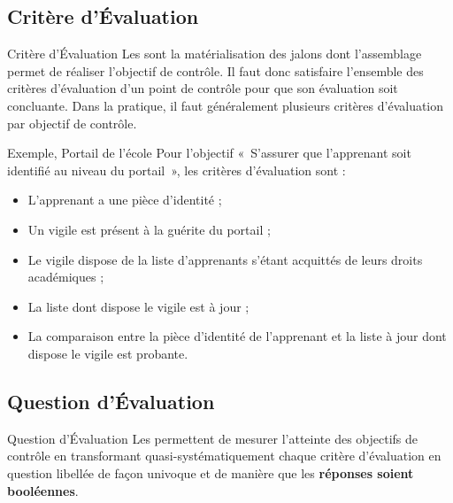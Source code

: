 \subsection{Critère d'Évaluation}

\begin{boxdef}{Critère d'Évaluation}
Les  sont la matérialisation des jalons dont
l'assemblage permet de réaliser l'objectif de contrôle. Il faut donc satisfaire
l'ensemble des critères d'évaluation d'un point de contrôle pour que son évaluation
soit concluante. Dans la pratique, il faut généralement plusieurs critères d'évaluation
par objectif de contrôle.
\end{boxdef}

\begin{boxlizbiz}{Exemple, Portail de l'école}
Pour l'objectif «~S'assurer que l'apprenant soit identifié au niveau du portail~»,
les critères d'évaluation sont :
\begin{itemize}
  \item L'apprenant a une pièce d'identité ;
  \item Un vigile est présent à la guérite du portail ;
  \item Le vigile dispose de la liste d'apprenants s'étant acquittés de leurs droits
    académiques ;
  \item La liste dont dispose le vigile est à jour ;
  \item La comparaison entre la pièce d'identité de l'apprenant et la liste à jour dont
    dispose le vigile est probante.
\end{itemize}
\end{boxlizbiz}

\subsection{Question d'Évaluation}

\begin{boxdef}{Question d'Évaluation}
Les  permettent de mesurer l'atteinte des objectifs
de contrôle en transformant quasi-systématiquement chaque critère d'évaluation en
question libellée de façon univoque et de manière que les \textbf{réponses soient
booléennes}.
\end{boxdef}

